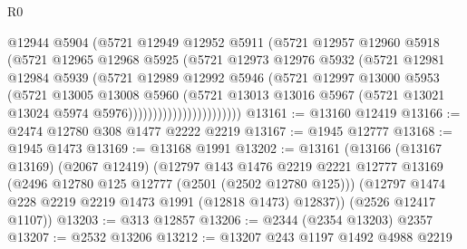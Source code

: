 \begin{lexlean}{R0}
\begin{coremodule}
                              @12944
                              @5904
                              (@5721
                                @12949
                                @12952
                                @5911
                                (@5721
                                  @12957
                                  @12960
                                  @5918
                                  (@5721
                                    @12965
                                    @12968
                                    @5925
                                    (@5721
                                      @12973
                                      @12976
                                      @5932
                                      (@5721
                                        @12981
                                        @12984
                                        @5939
                                        (@5721
                                          @12989
                                          @12992
                                          @5946
                                          (@5721
                                            @12997
                                            @13000
                                            @5953
                                            (@5721
                                              @13005
                                              @13008
                                              @5960
                                              (@5721
                                                @13013
                                                @13016
                                                @5967
                                                (@5721
                                                  @13021
                                                  @13024
                                                  @5974
                                                  @5976)))))))))))))))))))))))
@13161 := @13160 @12419
@13166 := @2474 @12780 @308 @1477 @2222 @2219
@13167 := @1945 @12777
@13168 := @1945 @1473
@13169 := @13168 @1991
@13202 := @13161
    (@13166
      (@13167 @13169)
      (@2067 @12419)
      (@12797
        @143
        @1476
        @2219
        @2221
        @12777
        @13169
        (@2496 @12780 @125 @12777 (@2501 (@2502 @12780 @125)))
        (@12797 @1474 @228 @2219 @2219 @1473 @1991 (@12818 @1473) @12837))
      (@2526 @12417 @1107))
@13203 := @313 @12857
@13206 := @2344 (@2354 @13203) @2357
@13207 := @2532 @13206
@13212 := @13207 @243 @1197 @1492 @4988 @2219

\end{coremodule}
\end{lexlean}
